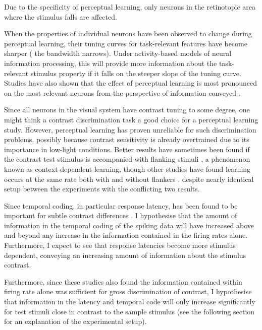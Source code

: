 Due to the specificity of perceptual learning, only neurons in the retinotopic area where the stimulus falls are affected.

When the properties of individual neurons have been observed to change during perceptual learning, their tuning curves for task-relevant features have become sharper (\ie{} the bandwidth narrows).
Under activity-based models of neural information processing, this will provide more information about the task-relevant stimulus property if it falls on the steeper slope of the tuning curve.
Studies have also shown that the effect of perceptual learning is most pronounced on the most relevant neurons from the perspective of information conveyed \cite{Raiguel2006}.



Since all neurons in the visual system have contrast tuning to some degree, one might think a contrast discrimination task a good choice for a perceptual learning study.
However, perceptual learning has proven unreliable for such discrimination problems, possibly because contrast sensitivity is already overtrained due to its importance in low-light conditions.
Better results have sometimes been found if the contrast test stimulus is accompanied with flanking stimuli \cite{Adini2002}, a phenomenon known as context-dependent learning, though other studies have found learning occurs at the same rate both with and without flankers \cite{Yu2004}, despite nearly identical setup between the experiments with the conflicting two results.

Since temporal coding, in particular response latency, has been found to be important for subtle contrast differences \cite{Reich2001,Arabzadeh2006}, I hypothesise that the amount of information in the temporal coding of the spiking data will have increased above and beyond any increase in the information contained in the firing rates alone.
Furthermore, I expect to see that response latencies become more stimulus dependent, conveying an increasing amount of information about the stimulus contrast.

Furthermore, since these studies \cite{Reich2001,Arabzadeh2006} also found the information contained within firing rate alone was sufficient for gross discrimination of contrast, I hypothesise that information in the latency and temporal code will only increase significantly for test stimuli close in contrast to the sample stimulus (see the following section for an explanation of the experimental setup).


